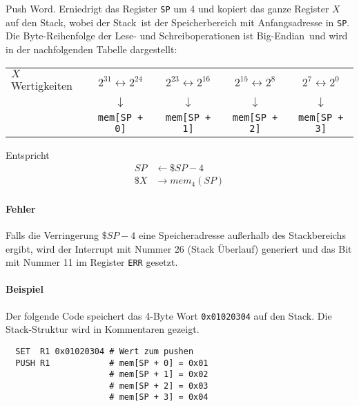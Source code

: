 \glqq Push Word\grqq.
Erniedrigt das Register \texttt{SP} um 4 und kopiert das ganze Register $X$ auf
den Stack, wobei der \glqq Stack\grqq\ ist der Speicherbereich mit
Anfangsadresse in \texttt{SP}.
Die Byte-Reihenfolge der Lese- und Schreiboperationen ist \glqq Big-Endian\grqq\
und wird in der nachfolgenden Tabelle dargestellt:
\begin{center}
\begin{tabular}{l|cccc}
  \toprule
  $X$  Wertigkeiten &
  $2^{31} \leftrightarrow 2^{24}$ &
  $2^{23} \leftrightarrow 2^{16}$ &
  $2^{15} \leftrightarrow 2^{8}$  &
  $2^{7}  \leftrightarrow 2^{0}$ 
  \\
  &
  $\downarrow$ & $\downarrow$ & $\downarrow$ & $\downarrow$ 
  \\
  \text{Stack-Bereich} &
  \texttt{mem[SP + 0]} &
  \texttt{mem[SP + 1]} &
  \texttt{mem[SP + 2]} &
  \texttt{mem[SP + 3]}
  \\\bottomrule
\end{tabular}
\end{center}


Entspricht
\begin{align*}
   SP & \gets \$SP - 4    \\
 \$X  & \to mem_{4}(SP)
\end{align*}


\paragraph{Fehler}
Falls die Verringerung $\$SP - 4$ eine Speicheradresse außerhalb des
Stackbereichs ergibt, wird der Interrupt mit Nummer 26 (Stack Überlauf)
\index{Stack!Überlauf}
generiert und das Bit mit Nummer 11 im Register \texttt{ERR} gesetzt.



\paragraph{Beispiel}
Der folgende Code speichert das 4-Byte Wort \texttt{0x01020304} auf den Stack.
Die Stack-Struktur wird in Kommentaren gezeigt.
\begin{lstlisting}
  SET  R1 0x01020304 # Wert zum pushen
  PUSH R1            # mem[SP + 0] = 0x01
                     # mem[SP + 1] = 0x02
                     # mem[SP + 2] = 0x03
                     # mem[SP + 3] = 0x04
\end{lstlisting}




